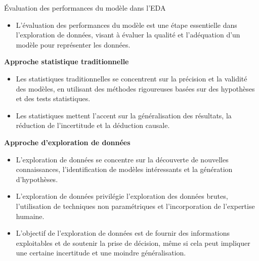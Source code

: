 \documentclass{beamer}
\begin{document}
\begin{frame}{Évaluation des performances du modèle dans l'EDA}
	
	
	\begin{itemize}
		\item L'évaluation des performances du modèle est une étape essentielle dans l'exploration de données, visant à évaluer la qualité et l'adéquation d'un modèle pour représenter les données.
	\end{itemize}
	
	\vspace{0.2cm}
	
	\textbf{Approche statistique traditionnelle}
	\begin{itemize}
		\item Les statistiques traditionnelles se concentrent sur la précision et la validité des modèles, en utilisant des méthodes rigoureuses basées sur des hypothèses et des tests statistiques.
		\item Les statistiques mettent l'accent sur la généralisation des résultats, la réduction de l'incertitude et la déduction causale.
	\end{itemize}
	
	\vspace{0.2cm}
	
	\textbf{Approche d'exploration de données}
	\begin{itemize}
		\item L'exploration de données se concentre sur la découverte de nouvelles connaissances, l'identification de modèles intéressants et la génération d'hypothèses.
		\item L'exploration de données privilégie l'exploration des données brutes, l'utilisation de techniques non paramétriques et l'incorporation de l'expertise humaine.
		\item L'objectif de l'exploration de données est de fournir des informations exploitables et de soutenir la prise de décision, même si cela peut impliquer une certaine incertitude et une moindre généralisation.
	\end{itemize}
	
\end{frame}
\end{document}
